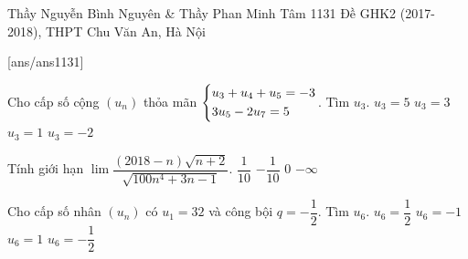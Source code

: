 \begin{name}
{Thầy Nguyễn Bình Nguyên \& Thầy Phan Minh Tâm} 
{1131 Đề GHK2 (2017-2018), THPT Chu Văn An, Hà Nội}
\end{name}
\setcounter{ex}{0}
[ans/ans1131]
\begin{ex}%
Cho cấp số cộng $\left(u_n\right)$ thỏa mãn $\left\{\begin{aligned}& u_3+u_4+u_5=-3 \\
		& 3u_5-2u_7=5\end{aligned}\right.$. Tìm $u_3$. 
	\choice
	{$u_3=5$}
	{$u_3=3$}
	{\True $u_3=1$}
	{$u_3=-2$}
\end{ex}
\begin{ex}%
	Tính giới hạn $\lim \dfrac{\left(2018-n\right)\sqrt{n+2}}{\sqrt{100n^4+3n-1}}$.
	\choice
	{$ \dfrac{1}{10}$}
	{$-\dfrac{1}{10}$}
	{\True $0$}
	{$-\infty $}
\end{ex}
\begin{ex}%
	Cho cấp số nhân $\left(u_n\right)$ có $u_1=32$ và công bội $q=-\dfrac{1}{2}$. Tìm $u_6$. 
	\choice
	{$u_6=\dfrac{1}{2}$}
	{\True $u_6=-1$}
	{$u_6=1$}
	{$u_6=-\dfrac{1}{2}$}
\end{ex}
